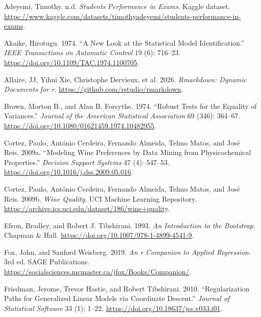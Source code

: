 \documentclass[
  10pt,
]{article}
\newlength{\cslhangindent}
\newenvironment{CSLReferences}[2] %
 {\begin{list}{}{%
  \setlength{\itemindent}{0pt}
  \setlength{\leftmargin}{0pt}
  \setlength{\parsep}{0pt}
  \ifodd #1
   \setlength{\leftmargin}{\cslhangindent}
   \setlength{\itemindent}{-1\cslhangindent}
  \fi
  \setlength{\itemsep}{#2\baselineskip}}}
 {\end{list}}
\begin{document}
\protect{}\label{refs}
\begin{CSLReferences}{1}{1}
Adeyemi, Timothy. n.d. \emph{Students Performance in Exams}. Kaggle
dataset.
\url{https://www.kaggle.com/datasets/timothyadeyemi/students-performance-in-exams}.

Akaike, Hirotugu. 1974. {``A New Look at the Statistical Model
Identification.''} \emph{IEEE Transactions on Automatic Control} 19 (6):
716--23. \url{https://doi.org/10.1109/TAC.1974.1100705}.

{Allaire, JJ, Yihui Xie, Christophe Dervieux, et al.} 2026.
\emph{Rmarkdown: Dynamic Documents for r}.
\url{https://github.com/rstudio/rmarkdown}.

Brown, Morton B., and Alan B. Forsythe. 1974. {``Robust Tests for the
Equality of Variances.''} \emph{Journal of the American Statistical
Association} 69 (346): 364--67.
\url{https://doi.org/10.1080/01621459.1974.10482955}.

Cortez, Paulo, António Cerdeira, Fernando Almeida, Telmo Matos, and José
Reis. 2009a. {``Modeling Wine Preferences by Data Mining from
Physicochemical Properties.''} \emph{Decision Support Systems} 47 (4):
547--53. \url{https://doi.org/10.1016/j.dss.2009.05.016}.

Cortez, Paulo, António Cerdeira, Fernando Almeida, Telmo Matos, and José
Reis. 2009b. \emph{Wine Quality}. UCI Machine Learning Repository.
\url{https://archive.ics.uci.edu/dataset/186/wine+quality}.

Efron, Bradley, and Robert J. Tibshirani. 1993. \emph{An Introduction to
the Bootstrap}. Chapman \& Hall.
\url{https://doi.org/10.1007/978-1-4899-4541-9}.

Fox, John, and Sanford Weisberg. 2019. \emph{An r Companion to Applied
Regression}. 3rd ed. SAGE Publications.
\url{https://socialsciences.mcmaster.ca/jfox/Books/Companion/}.

Friedman, Jerome, Trevor Hastie, and Robert Tibshirani. 2010.
{``Regularization Paths for Generalized Linear Models via Coordinate
Descent.''} \emph{Journal of Statistical Software} 33 (1): 1--22.
\url{https://doi.org/10.18637/jss.v033.i01}.


\end{CSLReferences}
\end{document}
